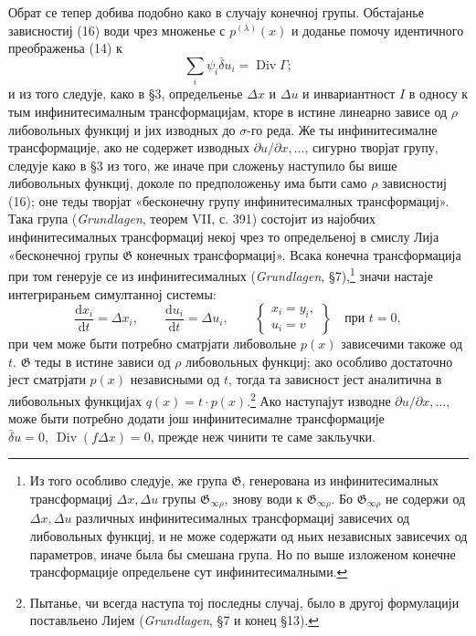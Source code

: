 ﻿\documentclass[11pt]{article}
\providecommand{\G}{\mathfrak G}
\providecommand{\D}{\Delta}
\providecommand{\p}{\partial}
\providecommand{\dd}{\mathrm d}
\DeclareMathOperator{\Div}{Div}
\providecommand{\bd}{\bar{\delta}}
\begin{document}
Обрат се тепер добива подобно како в случају конечној групы. Обстајанье зависностиј (16) води чрез множенье с \(p^{(\lambda)}(x)\) и доданье помочу идентичного преображеньа (14) к
\[
\sum_i\psi_i\bd u_i=\Div\Gamma;
\]
и из того следује, како в \S{}3, определьенье \(\D x\) и \(\D u\) и инвариантност \(I\) в односу к тым инфинитесималным трансформацијам, кторе в истине линеарно зависе од \(\rho\) либовольных функциј и јих изводных до \(\sigma\)-го реда. Же ты инфинитесималне трансформације, ако не содержет изводных \(\p u/\p x,\ldots\), сигурно творјат групу, следује како в \S{}3 из того, же иначе при сложеньу наступило бы више либовольных функциј, доколе по предположеньу има быти само \(\rho\) зависностиј (16); оне теды творјат «бесконечну групу инфинитесималных трансформациј». Така група (\emph{Grundlagen}, теорем VII, с. 391) состојит из најобчих инфинитесималных трансформациј некој чрез то определьеној в смислу Лија «бесконечној групы \(\G\) конечных трансформациј». Всака конечна трансформација при том генерује се из инфинитесималных (\emph{Grundlagen}, \S{}7),\footnote{Из того особливо следује, же група \(\G\), генерована из инфинитесималных трансформациј \(\D x,\D u\) групы \(\G_{\infty\rho}\), знову води к \(\G_{\infty\rho}\). Бо \(\G_{\infty\rho}\) не содержи од \(\D x,\D u\) различных инфинитесималных трансформациј зависечих од либовольных функциј, и не може содержати од ньих независных зависечих од параметров, иначе была бы смешана група. Но по выше изложеном конечне трансформације определьене сут инфинитесималными.} значи настаје интегрираньем симултанној системы:
\[
\frac{\dd x_i}{\dd t}=\D x_i,\qquad
\frac{\dd u_i}{\dd t}=\D u_i,\qquad
\left\{\begin{array}{l}
x_i=y_i,\\
u_i=v
\end{array}\right\}
\quad\text{при }t=0,
\]
при чем може быти потребно сматрјати либовольне \(p(x)\) зависечими такоже од \(t\). \(\G\) теды в истине зависи од \(\rho\) либовольных функциј; ако особливо достаточно јест сматрјати \(p(x)\) независными од \(t\), тогда та зависност јест аналитична в либовольных функцијах \(q(x)=t\cdot p(x)\).\footnote{Пытанье, чи всегда наступа тој последны случај, было в другој формулацији поставльено Лијем (\emph{Grundlagen}, \S{}7 и конец \S{}13).} Ако наступајут изводне \(\p u/\p x,\ldots\), може быти потребно додати још инфинитесималне трансформације \(\bd u=0,\ \Div(f\D x)=0\), прежде неж чинити те саме закльучки.
\end{document}
